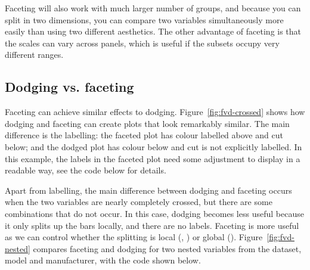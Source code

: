 Faceting will also work with much larger number of groups, and because you can split in two dimensions, you can compare two variables simultaneously more easily than using two different aesthetics.  The other advantage of faceting is that the scales can vary across panels, which is useful if the subsets occupy very different ranges.


\subsection{Dodging vs. faceting}
\label{sub:dodge-vs-facet}

Faceting can achieve similar effects to dodging. Figure~\ref{fig:fvd-crossed} shows how dodging and faceting can create plots that look remarkably similar. The main difference is the labelling: the faceted plot has colour labelled above and cut below; and the dodged plot has colour below and cut is not explicitly labelled. In this example, the labels in the faceted plot need some adjustment to display in a readable way, see the code below for details.

% 


Apart from labelling, the main difference between dodging and faceting occurs when the two variables are nearly completely crossed, but there are some combinations that do not occur.  In this case, dodging becomes less useful because it only splits up the bars locally, and there are no labels. Faceting is more useful as we can control whether the splitting is local (, ) or global (). Figure~\ref{fig:fvd-nested} compares faceting and dodging for two nested variables from the  dataset, model and manufacturer, with the code shown below.

% 
% 


